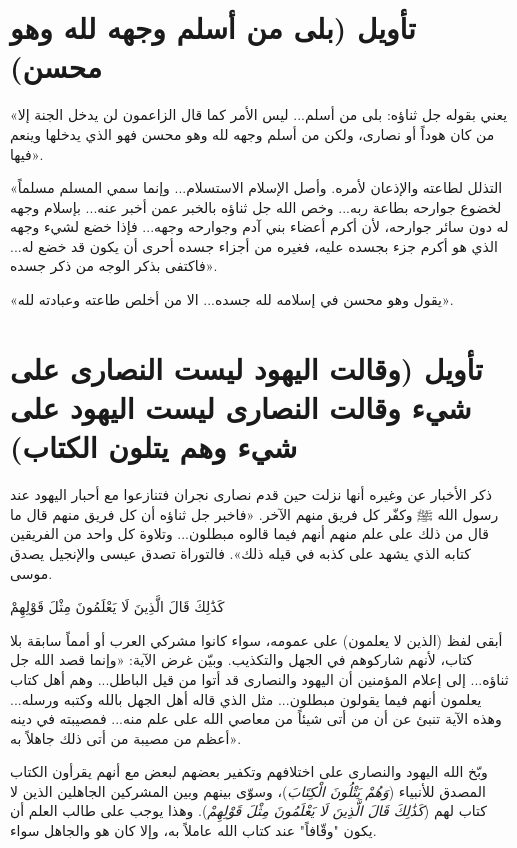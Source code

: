 \separator

\section{تأويل (بلى من أسلم وجهه لله وهو محسن)}
 «يعني بقوله جل ثناؤه: بلى من أسلم... ليس الأمر كما قال الزاعمون لن يدخل الجنة إلا من كان هوداً أو نصارى، ولكن من أسلم وجهه لله وهو محسن فهو الذي يدخلها وينعم فيها».

 «التذلل لطاعته والإذعان لأمره. وأصل الإسلام الاستسلام... وإنما سمي المسلم مسلماً لخضوع جوارحه بطاعة ربه... وخص الله جل ثناؤه بالخبر عمن أخبر عنه... بإسلام وجهه له دون سائر جوارحه، لأن أكرم أعضاء بني آدم وجوارحه وجهه... فإذا خضع لشيء وجهه الذي هو أكرم جزء بجسده عليه، فغيره من أجزاء جسده أحرى أن يكون قد خضع له... فاكتفى بذكر الوجه من ذكر جسده».

 «يقول وهو محسن في إسلامه لله جسده... الا من أخلص طاعته وعبادته لله».

\separator

\section{تأويل (وقالت اليهود ليست النصارى على شيء وقالت النصارى ليست اليهود على شيء وهم يتلون الكتاب)}
ذكر  الأخبار عن  وغيره أنها نزلت حين قدم نصارى نجران فتنازعوا مع أحبار اليهود عند رسول الله ﷺ وكفّر كل فريق منهم الآخر.
 «فاخبر جل ثناؤه أن كل فريق منهم قال ما قال من ذلك على علم منهم أنهم فيما قالوه مبطلون... وتلاوة كل واحد من الفريقين كتابه الذي يشهد على كذبه في قيله ذلك». فالتوراة تصدق عيسى والإنجيل يصدق موسى.

 \begin{ayah}كَذَٰلِكَ قَالَ الَّذِينَ لَا يَعْلَمُونَ مِثْلَ قَوْلِهِمْ\end{ayah}
أبقى  لفظ (الذين لا يعلمون) على عمومه، سواء كانوا مشركي العرب أو أمماً سابقة بلا كتاب، لأنهم شاركوهم في الجهل والتكذيب.
وبيّن غرض الآية: «وإنما قصد الله جل ثناؤه... إلى إعلام المؤمنين أن اليهود والنصارى قد أتوا من قيل الباطل... وهم أهل كتاب يعلمون أنهم فيما يقولون مبطلون... مثل الذي قاله أهل الجهل بالله وكتبه ورسله... وهذه الآية تنبئ عن أن من أتى شيئاً من معاصي الله على علم منه... فمصيبته في دينه أعظم من مصيبة من أتى ذلك جاهلاً به».

\begin{fawaid}
وبّخ الله اليهود والنصارى على اختلافهم وتكفير بعضهم لبعض مع أنهم يقرأون الكتاب المصدق للأنبياء (\textit{وَهُمْ يَتْلُونَ الْكِتَابَ})، وسوّى بينهم وبين المشركين الجاهلين الذين لا كتاب لهم (\textit{كَذَٰلِكَ قَالَ الَّذِينَ لَا يَعْلَمُونَ مِثْلَ قَوْلِهِمْ}). وهذا يوجب على طالب العلم أن يكون "وقّافاً" عند كتاب الله عاملاً به، وإلا كان هو والجاهل سواء.
\end{fawaid}


